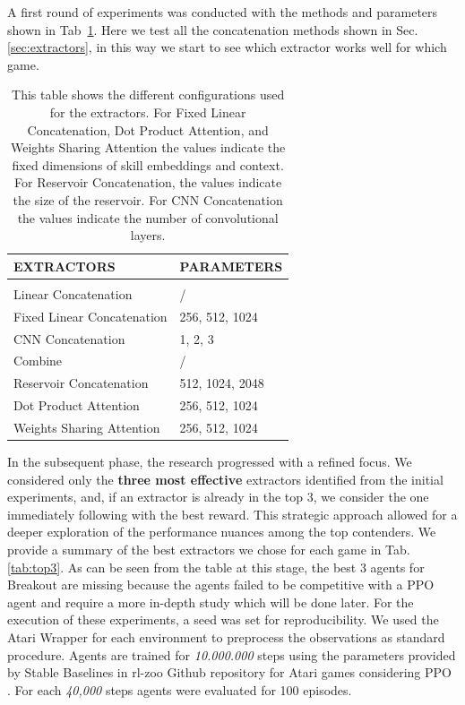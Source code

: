 A first round of experiments was conducted with the methods and parameters shown in Tab~\ref{tab:firstround}.
Here we test all the concatenation methods shown in Sec. \ref{sec:extractors}, in this way we start to see which extractor works well for which game.
\begin{table}[htbp]
    \begin{center}
        \begin{tabular}{ll}
            \multicolumn{1}{l}{EXTRACTORS}  &\multicolumn{1}{l}{\bf PARAMETERS}
            \\ \hline \\
            Linear Concatenation              &  / \\
            Fixed Linear Concatenation        & 256, 512, 1024 \\
            CNN Concatenation                 & 1, 2, 3 \\
            Combine                           & / \\
            Reservoir Concatenation           & 512, 1024, 2048 \\
            Dot Product Attention             & 256, 512, 1024 \\
            Weights Sharing Attention         & 256, 512, 1024 \\

        \end{tabular}
    \end{center}
    \caption{This table shows the different configurations used for the extractors. For Fixed Linear Concatenation, Dot Product Attention, and Weights Sharing Attention the values indicate the fixed dimensions of skill embeddings and context. For Reservoir Concatenation, the values indicate the size of the reservoir. For CNN Concatenation the values indicate the number of convolutional layers.}
    \label{tab:firstround}
\end{table}




In the subsequent phase, the research progressed with a refined focus. We considered only the \textbf{three most effective} extractors identified from the initial experiments, and, if an extractor is already in the top 3, we consider the one immediately following with the best reward.
This strategic approach allowed for a deeper exploration of the performance nuances among the top contenders.
We provide a summary of the best extractors we chose for each game in Tab. \ref{tab:top3}.
As can be seen from the table at this stage, the best 3 agents for Breakout are missing because the agents failed to be competitive with a PPO agent and require a more in-depth study which will be done later.
For the execution of these experiments, a seed was set for reproducibility. We used the Atari Wrapper for each environment to preprocess the observations as standard procedure. Agents are trained for \textit{10.000.000} steps using the parameters provided by Stable Baselines in rl-zoo Github repository for Atari games considering PPO \cite{rl-zoo3}.
For each \textit{40,000} steps agents were evaluated for 100 episodes.


